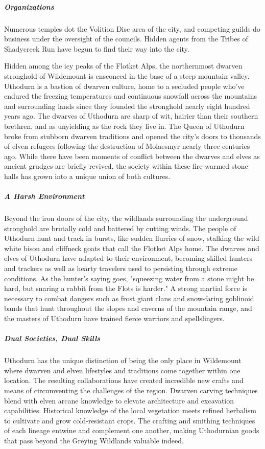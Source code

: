 \documentclass[10pt,a4paper,twoside,bg=print,twocolumn,openany,nodeprecatedcode]{dndbook}
\begin{document}
\subparagraph{Organizations}
Numerous temples dot the Volition Disc area of the city, and competing guilds do business under the oversight of the councils. Hidden agents from the Tribes of Shadycreek Run have begun to find their way into the city.

Hidden among the icy peaks of the Flotket Alps, the northernmost dwarven stronghold of Wildemount is ensconced in the base of a steep mountain valley. Uthodurn is a bastion of dwarven culture, home to a secluded people who've endured the freezing temperatures and continuous snowfall across the mountains and surrounding lands since they founded the stronghold nearly eight hundred years ago. The dwarves of Uthodurn are sharp of wit, hairier than their southern brethren, and as unyielding as the rock they live in. The Queen of Uthodurn broke from stubborn dwarven traditions and opened the city's doors to thousands of elven refugees following the destruction of Molaesmyr nearly three centuries ago. While there have been moments of conflict between the dwarves and elves as ancient grudges are briefly revived, the society within these fire-warmed stone halls has grown into a unique union of both cultures.

\subparagraph{A Harsh Environment}
Beyond the iron doors of the city, the wildlands surrounding the underground stronghold are brutally cold and battered by cutting winds. The people of Uthodurn hunt and track in bursts, like sudden flurries of snow, stalking the wild white bison and cliffneck goats that call the Flotket Alps home. The dwarves and elves of Uthodurn have adapted to their environment, becoming skilled hunters and trackers as well as hearty travelers used to persisting through extreme conditions. As the hunter's saying goes, "squeezing water from a stone might be hard, but snaring a rabbit from the Flots is harder." A strong martial force is necessary to combat dangers such as frost giant clans and snow-faring goblinoid bands that hunt throughout the slopes and caverns of the mountain range, and the masters of Uthodurn have trained fierce warriors and spellslingers.

\subparagraph{Dual Societies, Dual Skills}
Uthodurn has the unique distinction of being the only place in Wildemount where dwarven and elven lifestyles and traditions come together within one location. The resulting collaborations have created incredible new crafts and means of circumventing the challenges of the region. Dwarven carving techniques blend with elven arcane knowledge to elevate architecture and excavation capabilities. Historical knowledge of the local vegetation meets refined herbalism to cultivate and grow cold-resistant crops. The crafting and smithing techniques of each lineage entwine and complement one another, making Uthodurnian goods that pass beyond the Greying Wildlands valuable indeed.
\end{document}
